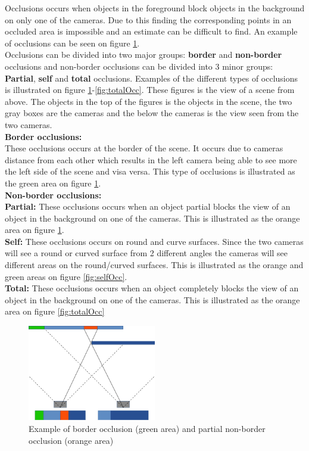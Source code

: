 Occlusions occurs when objects in the foreground block objects in the background on only one of the cameras. Due to this finding the corresponding points in an occluded area is impossible and an estimate can be difficult to find. An example of occlusions can be seen on figure \ref{fig:borNParOcc}. \\

Occlusions can be divided into two major groups: \textbf{border} and \textbf{non-border} occlusions and non-border occlusions can be divided into 3 minor groups: \textbf{Partial}, \textbf{self} and \textbf{total} occlusions. Examples of the different types of occlusions is illustrated on figure \ref{fig:borNParOcc}-\ref{fig:totalOcc}. These figures is the view of a scene from above. The objects in the top of the figures is the objects in the scene, the two gray boxes are the cameras and the below the cameras is the view seen from the two cameras.\\

\textbf{Border occlusions:} \\
These occlusions occurs at the border of the scene. It occurs due to cameras distance from each other which results in the left camera being able to see more the left side of the scene and visa versa. This type of occlusions is illustrated as the green area on figure \ref{fig:borNParOcc}. \\
\textbf{Non-border occlusions:}\\
\textbf{Partial:} These occlusions occurs when an object partial blocks the view of an object in the background on one of the cameras. This is illustrated as the orange area on figure \ref{fig:borNParOcc}.  \\
\textbf{Self:} These occlusions occurs on round and curve surfaces. Since the two cameras will see a round or curved surface from 2 different angles the cameras will see different areas on the round/curved surfaces. This is illustrated as the orange and green areas on figure \ref{fig:selfOcc}. \\
\textbf{Total:} These occlusions occurs when an object completely blocks the view of an object in the background on one of the cameras. This is illustrated as the orange area on figure \ref{fig:totalOcc}\\

\begin{figure}
  \centering
  \includegraphics[width=0.5\textwidth]{images/borNParOcc}
  \caption{Example of border occlusion (green area) and partial non-border occlusion (orange area)}
  \label{fig:borNParOcc}
\end{figure}

